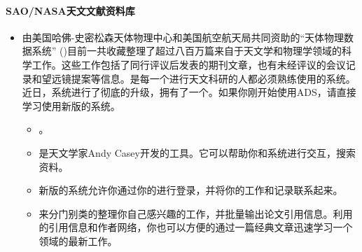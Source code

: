 \documentclass[letterpaper,10pt,english]{sphinxmanual}
\begin{document}
\paragraph{SAO/NASA天文文献资料库}
\label{\detokenize{resource/research/getting_started_cn:sao-nasaads}}\begin{itemize}
\item {} 
由美国哈佛-史密松森天体物理中心和美国航空航天局共同资助的“天体物理数据系统”
()目前一共收藏整理了超过八百万篇来自于天文学和物理学领域的科学工作。这些工作包括了同行评议后发表的期刊文章，也有未经评议的会议记录和望远镜提案等信息。是每一个进行天文科研的人都必须熟练使用的系统。近日，系统进行了彻底的升级，拥有了一个。如果你刚开始使用ADS，请直接学习使用新版的系统。
\begin{itemize}
\item {} 
。

\item {} 
 是天文学家Andy
Casey开发的工具。它可以帮助你和系统进行交互，搜索资料。

\item {} 
新版的系统允许你通过你的进行登录，并将你的工作和记录联系起来。

\item {} 
来分门别类的整理你自己感兴趣的工作，并批量输出论文引用信息。利用的引用信息和作者网络，你也可以方便的通过一篇经典文章迅速学习一个领域的最新工作。

\end{itemize}

\end{itemize}
\end{document}

